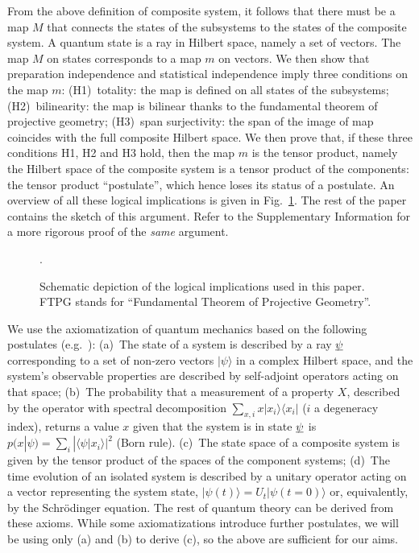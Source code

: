 \documentclass[aps,prl,amsmath,amssymb,twocolumn,nofootinbib]{revtex4}
\theoremstyle{plain}
\theoremstyle{definition}
\theoremstyle{remark}
\newcommand{\pj}[1] {\underbar{$#1$}}
\def\>{\rangle}
\def\<{\langle}
\begin{document}
From the above definition of composite system, it follows that there
must be a map $M$ that connects the states of the subsystems to the
states of the composite system. A quantum state is a ray in Hilbert
space, namely a set of vectors. The map $M$ on states corresponds to a
map $m$ on vectors. We then show that preparation independence and
statistical independence imply three conditions on the map $m$:
(H1)~totality: the map is defined on all states of the subsystems;
(H2)~bilinearity: the map is bilinear thanks to the fundamental
theorem of projective geometry; (H3)~span surjectivity: the span of
the image of map coincides with the full composite Hilbert space.  We
then prove that, if these three conditions H1, H2 and H3 hold, then
the map $m$ is the tensor product, namely the Hilbert space of the
composite system is a tensor product of the components: the tensor
product ``postulate'', which hence loses its status of a postulate. An
overview of all these logical implications is given in
Fig.~\ref{f:fig}. The rest of the paper contains the sketch of this
argument. Refer to the Supplementary Information for a more rigorous
proof of the \emph{same} argument.

\begin{figure}[ht]
.\hsize\leavevmode{}
\caption{Schematic depiction of the logical implications used
in this paper. FTPG stands for ``Fundamental Theorem of Projective Geometry''.  \label{f:fig}}\end{figure}

We use the axiomatization of quantum mechanics based on the following
postulates (e.g.~\cite{ozawa,masanes,wootters,nielsenchuang}): (a)~The state of a
system is described by a ray $\pj{\psi}$ corresponding to a set of
non-zero vectors $|\psi\>$ in a complex Hilbert space, and the
system's observable properties are described by self-adjoint operators
acting on that space; (b)~The probability that a measurement of a
property $X$, described by the operator with spectral decomposition
$\sum_{x,i}x|x_i\>\<x_i|$ ($i$ a degeneracy index), returns a value
$x$ given that the system is in state $\pj{\psi}$ is
$p(x|\psi)=\sum_i|\<\psi|x_i\>|^2$ (Born rule). (c)~The state
space of a composite system is given by the tensor product of the
spaces of the component systems; (d)~The time evolution of an isolated
system is described by a unitary operator acting on a vector
representing the system state, $|\psi({t})\>=U_{t}|\psi({t}=0)\>$ or,
equivalently, by the Schr\"odinger equation. The rest of quantum
theory can be derived from these axioms. While some axiomatizations
introduce further postulates, we will be using only (a) and (b) to
derive (c), so the above are sufficient for our aims.
\end{document}

